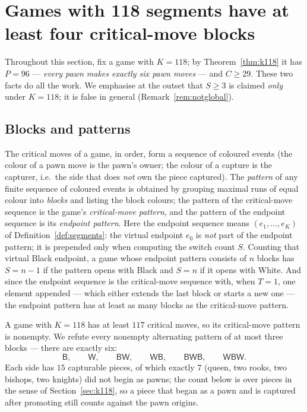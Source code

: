 \documentclass[11pt]{article}
\theoremstyle{definition}
\theoremstyle{remark}
\theoremstyle{plain}
\begin{document}
\section{Games with 118 segments have at least four critical-move
blocks}
\label{sec:switches}

Throughout this section, fix a game with $K = 118$; by
Theorem~\ref{thm:k118} it has $P = 96$ --- \emph{every pawn makes exactly
six pawn moves} --- and $C \ge 29$. These two facts do all the work. We
emphasise at the outset that $S \ge 3$ is claimed \emph{only} under
$K = 118$; it is false in general (Remark~\ref{rem:notglobal}).

\subsection{Blocks and patterns}

The critical moves of a game, in order, form a sequence of coloured events
(the colour of a pawn move is the pawn's owner; the colour of a capture is
the capturer, i.e.\ the side that does \emph{not} own the piece captured).
The \emph{pattern} of any finite sequence of coloured events is obtained
by grouping maximal runs of equal colour into \emph{blocks} and listing
the block colours; the pattern of the critical-move sequence is the
game's \emph{critical-move pattern}, and the pattern of the endpoint
sequence is its \emph{endpoint pattern}. Here the endpoint sequence
means $(e_1, \dots, e_K)$ of Definition~\ref{def:segments}: the virtual
endpoint $e_0$ is \emph{not} part of the endpoint pattern; it is
prepended only when computing the switch count $S$. Counting that
virtual Black endpoint, a game whose endpoint pattern consists of $n$
blocks has $S = n - 1$ if the pattern opens with Black and $S = n$ if it
opens with White. And since the endpoint sequence is the critical-move
sequence with, when $T = 1$, one element appended --- which either
extends the last block or starts a new one --- the endpoint pattern has
at least as many blocks as the critical-move pattern.

A game with $K = 118$ has at least $117$ critical moves, so its
critical-move pattern is nonempty. We refute every nonempty alternating
pattern of at most three blocks --- there are exactly six:
\[
  \mathsf{B}, \qquad \mathsf{W}, \qquad \mathsf{BW}, \qquad \mathsf{WB},
  \qquad \mathsf{BWB}, \qquad \mathsf{WBW}.
\]
Each side has $15$ capturable pieces, of which exactly $7$ (queen, two
rooks, two bishops, two knights) did not begin as pawns; the count below is
over pieces in the sense of Section~\ref{sec:k118}, so a piece that began
as a pawn and is captured after promoting still counts against the pawn
origins.
\end{document}
